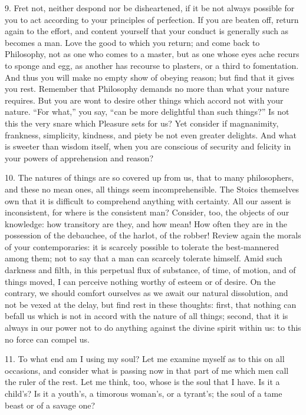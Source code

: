 \documentclass{book}
\begin{document}
9. Fret not, neither despond nor be disheartened, if it be not always
possible for you to act according to your principles of perfection. If
you are beaten off, return again to the effort, and content yourself
that your conduct is generally such as becomes a man. Love the good to
which you return; and come back to Philosophy, not as one who comes to
a master, but as one whose eyes ache recurs to sponge and egg, as
another has recourse to plasters, or a third to fomentation. And thus
you will make no empty show of obeying reason; but find that it gives
you rest. Remember that Philosophy demands no more than what your
nature requires. But you are wont to desire other things which accord
not with your nature. ``For what,'' you say, ``can be more delightful
than such things?'' Is not this the very snare which Pleasure sets for
us? Yet consider if magnanimity, frankness, simplicity, kindness, and
piety be not even greater delights. And what is sweeter than wisdom
itself, when you are conscious of security and felicity in your powers
of apprehension and reason?

10. The natures of things are so covered up from us, that to many
philosophers, and these no mean ones, all things seem incomprehensible.
The Stoics themselves own that it is difficult to comprehend anything
with certainty. All our assent is inconsistent, for where is the
consistent man? Consider, too, the objects of our knowledge: how
transitory are they, and how mean! How often they are in the
possession of the debauchee, of the harlot, of the robber!  Review
again the morals of your contemporaries: it is scarcely possible to
tolerate the best-mannered among them; not to say that a man can
scarcely tolerate himself. Amid such darkness and filth, in this
perpetual flux of substance, of time, of motion, and of things moved,
I can perceive nothing worthy of esteem or of desire. On the contrary,
we should comfort ourselves as we await our natural dissolution, and
not be vexed at the delay, but find rest in these thoughts: first,
that nothing can befall us which is not in accord with the nature of
all things; second, that it is always in our power not to do anything
against the divine spirit within us: to this no force can compel us.

11. To what end am I using my soul? Let me examine myself as to this
on all occasions, and consider what is passing now in that part of me
which men call the ruler of the rest. Let me think, too, whose is the
soul that I have. Is it a child's? Is it a youth's, a timorous
woman's, or a tyrant's; the soul of a tame beast or of a savage one?
\end{document}
